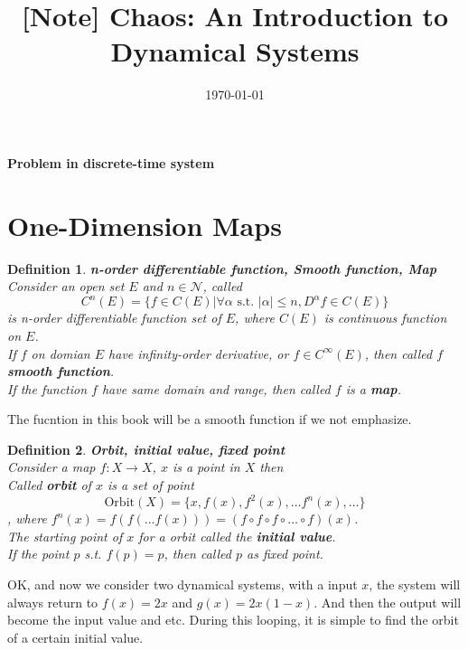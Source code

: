 \documentclass[12pt]{article}
\title{[Note] Chaos: An Introduction to Dynamical Systems}
\author{}
\date{\today}
\theoremstyle{plain}
\newtheorem{definition}{\textbf{Definition}}[section]
\begin{document}
\maketitle

{
\begin{center}
\LARGE \textbf{Problem in discrete-time system}
\end{center}
}
\section{One-Dimension Maps}

\begin{definition}\textbf{n-order differentiable function, Smooth function, Map}
\\\noindent Consider an open set $E$ and $n \in \mathcal N$, called 
$$
C^n(E) = \{f \in C(E) | \forall \alpha \text{ s.t. } |\alpha| \leq n, D^\alpha f \in C(E)\}
$$
is n-order differentiable function set of $E$, where $C(E)$ is continuous function on $E$.
\\\noindent If $f$ on domian $E$ have infinity-order derivative, or $f \in C^\infty(E)$, then called $f$ \textbf{smooth function}.
\\\noindent If the function $f$ have same domain and range, then called $f$ is a \textbf{map}.
\end{definition}

{\color{red} The fucntion in this book will be a smooth function if we not emphasize.}

\begin{definition}\textbf{Orbit, initial value, fixed point}
\\\noindent Consider a map $f: X \rightarrow X$, $x$ is a point in $X$ then 
\\\noindent Called \textbf{orbit} of $x$ is a set of point 
$$
\text{Orbit}(X) = \{x, f(x), f^2(x), \ldots f^n(x), \ldots\}
$$
, where $f^n(x) = f(f(\ldots f(x))) = (f\circ f \circ f \circ \ldots \circ f)(x)$.
\\\noindent The starting point of $x$ for a orbit called the \textbf{initial value}.
\\\noindent If the point $p$ s.t. $f(p) = p$, then called $p$ as fixed point.
\end{definition}

OK, and now we consider two dynamical systems, with a input $x$, the system will always return to $f(x) = 2x$ and $g(x) = 2x(1-x)$. And then the output will become the input value and etc. During this looping, it is simple to find the orbit of a certain initial value.
\end{document}
